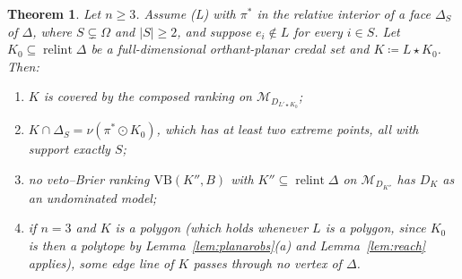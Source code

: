 \documentclass[11pt]{article}
\newcommand{\M}{\mathcal{M}}
\newcommand{\VB}{\mathrm{VB}}
\DeclareMathOperator{\relint}{relint}
\theoremstyle{plain}
\newtheorem{theorem}{Theorem}[section]
\theoremstyle{definition}
\theoremstyle{remark}
\begin{document}
\begin{theorem}\label{thm:BE}
Let $n\ge3$. Assume (L) with $\pi^\ast$ in the relative interior of a face $\Delta_S$ of
$\Delta$, where $S\subsetneq\Omega$ and $|S|\ge2$, and suppose $e_i\notin L$ for every
$i\in S$. Let $K_0\subseteq\relint\Delta$ be a full-dimensional orthant-planar credal set
and $K\coloneqq L\star K_0$. Then:
\begin{enumerate}[label=(\alph*)]
  \item $K$ is covered by the composed ranking on $\M_{D_{L'\star K_0}}$;
  \item $K\cap\Delta_S=\nu(\pi^\ast\odot K_0)$, which has at least two extreme points, all
  with support exactly $S$;
  \item no veto--Brier ranking $\VB(K'',B)$ with $K''\subseteq\relint\Delta$ on
  $\M_{D_{K''}}$ has $D_K$ as an undominated model;
  \item if $n=3$ and $K$ is a polygon (which holds whenever $L$ is a polygon, since $K_0$
  is then a polytope by Lemma~\ref{lem:planarobs}(a) and Lemma~\ref{lem:reach} applies),
  some edge line of $K$ passes through no vertex of $\Delta$.
\end{enumerate}
\end{theorem}
\end{document}
